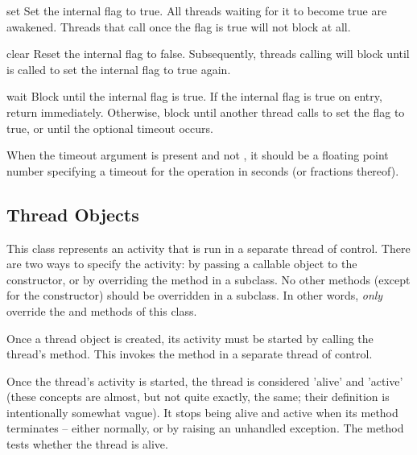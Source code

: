 \begin{methoddesc}{set}{}
Set the internal flag to true.
All threads waiting for it to become true are awakened.
Threads that call  once the flag is true will not block
at all.
\end{methoddesc}

\begin{methoddesc}{clear}{}
Reset the internal flag to false.
Subsequently, threads calling  will block until  is
called to set the internal flag to true again.
\end{methoddesc}

\begin{methoddesc}{wait}{}
Block until the internal flag is true.
If the internal flag is true on entry, return immediately.  Otherwise,
block until another thread calls  to set the flag to
true, or until the optional timeout occurs.

When the timeout argument is present and not , it should be a
floating point number specifying a timeout for the operation in
seconds (or fractions thereof).
\end{methoddesc}


\subsection{Thread Objects \label{thread-objects}}

This class represents an activity that is run in a separate thread
of control.  There are two ways to specify the activity: by
passing a callable object to the constructor, or by overriding the
 method in a subclass.  No other methods (except for the
constructor) should be overridden in a subclass.  In other words, 
\emph{only}  override the  and 
methods of this class.

Once a thread object is created, its activity must be started by
calling the thread's  method.  This invokes the
 method in a separate thread of control.

Once the thread's activity is started, the thread is considered
'alive' and 'active' (these concepts are almost, but not quite
exactly, the same; their definition is intentionally somewhat
vague).  It stops being alive and active when its 
method terminates -- either normally, or by raising an unhandled
exception.  The  method tests whether the thread is
alive.

